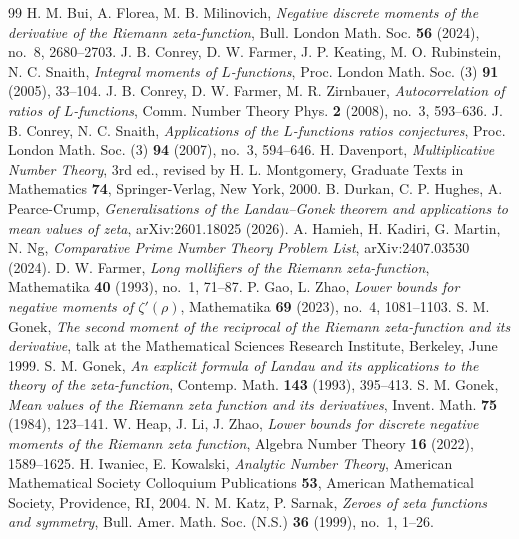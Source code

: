 \documentclass[10pt,a4paper]{amsart}
\numberwithin{equation}{section}
\begin{document}
\begin{thebibliography}{99}
 H. M. Bui, A. Florea, M. B. Milinovich, \emph{Negative discrete moments of the derivative of the Riemann zeta-function}, Bull. London Math. Soc. \textbf{56} (2024), no.~8, 2680--2703.
 J. B. Conrey, D. W. Farmer, J. P. Keating, M. O. Rubinstein, N. C. Snaith, \emph{Integral moments of $L$-functions}, Proc. London Math. Soc. (3) \textbf{91} (2005), 33--104.
 J. B. Conrey, D. W. Farmer, M. R. Zirnbauer, \emph{Autocorrelation of ratios of $L$-functions}, Comm. Number Theory Phys. \textbf{2} (2008), no.~3, 593--636.
 J. B. Conrey, N. C. Snaith, \emph{Applications of the $L$-functions ratios conjectures}, Proc. London Math. Soc. (3) \textbf{94} (2007), no.~3, 594--646.
 H. Davenport, \emph{Multiplicative Number Theory}, 3rd ed., revised by H. L. Montgomery, Graduate Texts in Mathematics \textbf{74}, Springer-Verlag, New York, 2000.
 B. Durkan, C. P. Hughes, A. Pearce-Crump, \emph{Generalisations of the Landau--Gonek theorem and applications to mean values of zeta}, arXiv:2601.18025 (2026).
 A. Hamieh, H. Kadiri, G. Martin, N. Ng, \emph{Comparative Prime Number Theory Problem List}, arXiv:2407.03530 (2024).
 D. W. Farmer, \emph{Long mollifiers of the Riemann zeta-function}, Mathematika \textbf{40} (1993), no.~1, 71--87.
 P. Gao, L. Zhao, \emph{Lower bounds for negative moments of $\zeta'(\rho)$}, Mathematika \textbf{69} (2023), no.~4, 1081--1103.
 S. M. Gonek, \emph{The second moment of the reciprocal of the Riemann zeta-function and its derivative}, talk at the Mathematical Sciences Research Institute, Berkeley, June 1999.
 S. M. Gonek, \emph{An explicit formula of Landau and its applications to the theory of the zeta-function}, Contemp. Math. \textbf{143} (1993), 395--413.
 S. M. Gonek, \emph{Mean values of the Riemann zeta function and its derivatives}, Invent. Math. \textbf{75} (1984), 123--141.
 W. Heap, J. Li, J. Zhao, \emph{Lower bounds for discrete negative moments of the Riemann zeta function}, Algebra Number Theory \textbf{16} (2022), 1589--1625.
 H. Iwaniec, E. Kowalski, \emph{Analytic Number Theory}, American Mathematical Society Colloquium Publications \textbf{53}, American Mathematical Society, Providence, RI, 2004.
 N. M. Katz, P. Sarnak, \emph{Zeroes of zeta functions and symmetry}, Bull. Amer. Math. Soc. (N.S.) \textbf{36} (1999), no.~1, 1--26.

\end{thebibliography}
\end{document}
